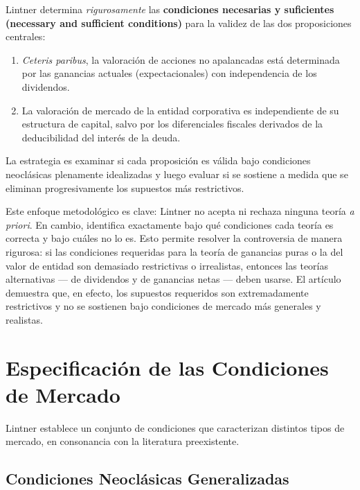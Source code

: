 \documentclass[12pt]{article}
\begin{document}
Lintner determina \textit{rigurosamente} las \textbf{condiciones necesarias y suficientes (necessary and sufficient conditions)} para la validez de las dos proposiciones centrales:
\begin{enumerate}
  \item \textit{Ceteris paribus}, la valoraci\'on de acciones no apalancadas est\'a determinada por las ganancias actuales (expectacionales) con independencia de los dividendos.
  \item La valoraci\'on de mercado de la entidad corporativa es independiente de su estructura de capital, salvo por los diferenciales fiscales derivados de la deducibilidad del inter\'es de la deuda.
\end{enumerate}

La estrategia es examinar si cada proposici\'on es v\'alida bajo condiciones neocl\'asicas plenamente idealizadas y luego evaluar si se sostiene a medida que se eliminan progresivamente los supuestos m\'as restrictivos.

\begin{explicacion}
Este enfoque metodol\'ogico es clave: Lintner no acepta ni rechaza ninguna teor\'ia \textit{a priori}. En cambio, identifica exactamente bajo qu\'e condiciones cada teor\'ia es correcta y bajo cu\'ales no lo es. Esto permite resolver la controversia de manera rigurosa: si las condiciones requeridas para la teor\'ia de ganancias puras o la del valor de entidad son demasiado restrictivas o irrealistas, entonces las teor\'ias alternativas --- de dividendos y de ganancias netas --- deben usarse. El art\'iculo demuestra que, en efecto, los supuestos requeridos son extremadamente restrictivos y no se sostienen bajo condiciones de mercado m\'as generales y realistas.
\end{explicacion}

\section{Especificaci\'on de las Condiciones de Mercado}

Lintner establece un conjunto de condiciones que caracterizan distintos tipos de mercado, en consonancia con la literatura preexistente.

\subsection{Condiciones Neocl\'asicas Generalizadas}
\end{document}
